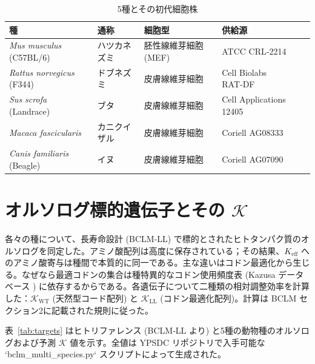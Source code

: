 \documentclass[12pt,a4paper]{ltjsarticle}
\newcommand{\REL}{\mathcal{K}}          %
\begin{document}
	\begin{table}[H]
		\centering
		\caption{5種とその初代細胞株}
		\label{tab:species}
		\begin{tabular}{@{}lllll@{}}
			\toprule
			\textbf{種} & \textbf{通称} & \textbf{細胞型} & \textbf{供給源} \\
			\midrule
			\textit{Mus musculus} (C57BL/6) & ハツカネズミ & 胚性線維芽細胞 (MEF) & ATCC CRL‑2214 \\
			\textit{Rattus norvegicus} (F344) & ドブネズミ & 皮膚線維芽細胞 & Cell Biolabs RAT‑DF \\
			\textit{Sus scrofa} (Landrace) & ブタ & 皮膚線維芽細胞 & Cell Applications 12405 \\
			\textit{Macaca fascicularis} & カニクイザル & 皮膚線維芽細胞 & Coriell AG08333 \\
			\textit{Canis familiaris} (Beagle) & イヌ & 皮膚線維芽細胞 & Coriell AG07090 \\
			\bottomrule
		\end{tabular}
	\end{table}
	
	\section{オルソログ標的遺伝子とその \(\REL\)}
	\label{sec:genes}
	各々の種について、長寿命設計 (BCLM‑LL) で標的とされたヒトタンパク質のオルソログを同定した。アミノ酸配列は高度に保存されている；その結果、\(K_{\mathrm{eff}}\) へのアミノ酸寄与は種間で本質的に同一である。主な違いはコドン最適化から生じる。なぜなら最適コドンの集合は種特異的なコドン使用頻度表 (Kazusa データベース \cite{codon_usage_db}) に依存するからである。各遺伝子について二種類の相対調整効率を計算した：\(\REL_{\mathrm{WT}}\) (天然型コード配列) と \(\REL_{\mathrm{LL}}\) (コドン最適化配列)。計算は BCLM セクション2に記載された規則に従った。
	
	表~\ref{tab:targets} はヒトリファレンス (BCLM‑LL より) と5種の動物種のオルソログおよび予測 \(\REL\) 値を示す。全値は YPSDC リポジトリで入手可能な `bclm\_multi\_species.py` スクリプトによって生成された。
	
\end{document}
